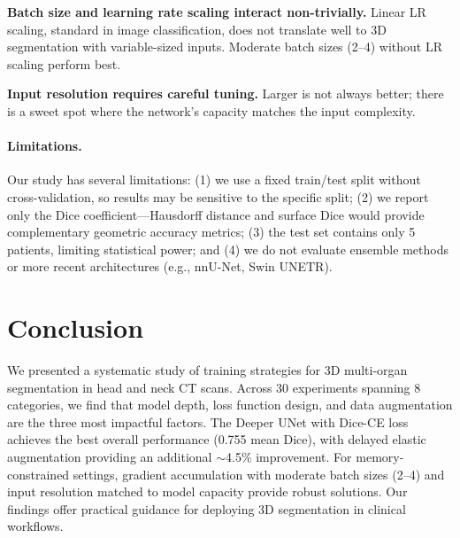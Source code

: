 \documentclass[10pt,twocolumn]{article}
\begin{document}
\textbf{Batch size and learning rate scaling interact non-trivially.} Linear LR scaling, standard in image classification, does not translate well to 3D segmentation with variable-sized inputs. Moderate batch sizes (2--4) without LR scaling perform best.

\textbf{Input resolution requires careful tuning.} Larger is not always better; there is a sweet spot where the network's capacity matches the input complexity.

\paragraph{Limitations.}
Our study has several limitations: (1) we use a fixed train/test split without cross-validation, so results may be sensitive to the specific split; (2) we report only the Dice coefficient---Hausdorff distance and surface Dice would provide complementary geometric accuracy metrics; (3) the test set contains only 5 patients, limiting statistical power; and (4) we do not evaluate ensemble methods or more recent architectures (e.g., nnU-Net, Swin UNETR).

\section{Conclusion}
\label{sec:conclusion}

We presented a systematic study of training strategies for 3D multi-organ segmentation in head and neck CT scans. Across 30 experiments spanning 8 categories, we find that model depth, loss function design, and data augmentation are the three most impactful factors. The Deeper UNet with Dice-CE loss achieves the best overall performance (0.755 mean Dice), with delayed elastic augmentation providing an additional $\sim$4.5\% improvement. For memory-constrained settings, gradient accumulation with moderate batch sizes (2--4) and input resolution matched to model capacity provide robust solutions. Our findings offer practical guidance for deploying 3D segmentation in clinical workflows.
\end{document}

